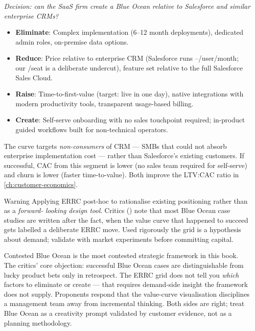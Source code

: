 \begin{example}
\emph{Decision: can the SaaS firm create a Blue Ocean relative to Salesforce and similar
enterprise CRMs?}

\begin{itemize}
  \item \textbf{Eliminate}: Complex implementation (6--12 month deployments), dedicated
        admin roles, on-premise data options.
  \item \textbf{Reduce}: Price relative to enterprise CRM (Salesforce runs
        --/user/month; our /seat is a deliberate undercut),
        feature set relative to the full Salesforce Sales Cloud.
  \item \textbf{Raise}: Time-to-first-value (target: live in one day), native integrations
        with modern productivity tools, transparent usage-based billing.
  \item \textbf{Create}: Self-serve onboarding with no sales touchpoint required; in-product
        guided workflows built for non-technical operators.
\end{itemize}

The curve targets \emph{non-consumers} of CRM --- SMBs that could not absorb enterprise
implementation cost --- rather than Salesforce's existing customers. If successful, CAC
from this segment is lower (no sales team required for self-serve) and churn is lower
(faster time-to-value). Both improve the LTV:CAC ratio in \cref{ch:customer-economics}.
\end{example}

\begin{admonition}{Warning}
Applying ERRC post-hoc to rationalise existing positioning rather than as a \emph{forward-
looking design tool}. Critics (\parencite{dranove7theconomics}) note that most Blue Ocean
case studies are written after the fact, when the value curve that happened to succeed gets
labelled a deliberate ERRC move. Used rigorously the grid is a hypothesis about demand;
validate with market experiments before committing capital.
\end{admonition}

\begin{admonition}{Contested}
Blue Ocean is the most contested strategic framework in this book. The critics' core
objection: successful Blue Ocean cases are distinguishable from lucky product bets only
in retrospect. The ERRC grid does not tell you \emph{which} factors to eliminate or
create --- that requires demand-side insight the framework does not supply. Proponents
respond that the value-curve visualisation disciplines a management team away from
incremental thinking. Both sides are right; treat Blue Ocean as a creativity prompt
validated by customer evidence, not as a planning methodology.
\end{admonition}

